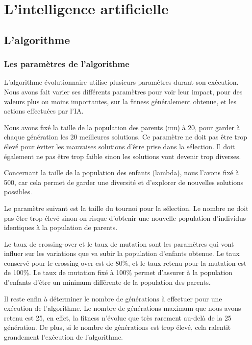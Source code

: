 \section{L'intelligence artificielle}

\subsection{L'algorithme}
	
	\subsubsection{Les paramètres de l'algorithme}
	
		L'algorithme évolutionnaire utilise plusieurs paramètres durant son exécution.
		Nous avons fait varier ses différents paramètres pour voir leur impact, pour des valeurs plus ou moins importantes,
		sur la fitness généralement obtenue, et les actions effectuées par l'IA.
		
		Nous avons fixé la taille de la population des parents (mu) à 20, pour garder à chaque génération les 20 meilleures
		solutions. Ce paramètre ne doit pas être trop élevé pour éviter les mauvaises solutions d'être prise dans la sélection.
		Il doit également ne pas être trop faible sinon les solutions vont devenir trop diverses.
		
		Concernant la taille de la population des enfants (lambda), nous l'avons fixé à 500, car cela permet de garder une diversité et d'explorer de nouvelles solutions possibles.
		
		Le paramètre suivant est la taille du tournoi pour la sélection. Le nombre ne doit pas être trop élevé sinon
		on risque d'obtenir une nouvelle population d'individus identiques à la population de parents.

		Le taux de crossing-over et le taux de mutation sont les paramètres qui vont influer sur les variations
		que va subir la population d'enfants obtenue. Le taux conservé pour le crossing-over est de 80\%, et le taux
		retenu pour la mutation est de 100\%. Le taux de mutation fixé à 100\% permet d'assurer à la population d'enfants
		d'être un minimum différente de la population des parents.
		
		Il reste enfin à déterminer le nombre de générations à effectuer pour une exécution de l'algorithme.
		Le nombre de générations maximum que nous avons retenu est 25, en effet, la fitness n'évolue que très 
		rarement au-delà de la 25\ieme{} génération. De plus, si le nombre de générations est trop élevé, cela
		ralentit grandement l'exécution de l'algorithme.
	
